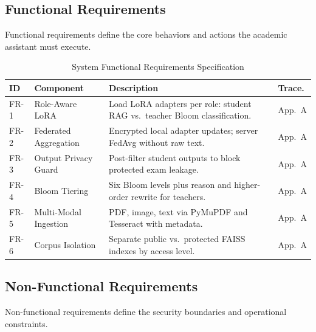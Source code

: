 \subsection{Functional Requirements}
Functional requirements define the core behaviors and actions the academic assistant must execute. 

\begin{small}
\begin{longtable}{|p{}|p{}|p{}|p{}|}
\caption{System Functional Requirements Specification} \label{tab:functional_requirements} \\
\hline
\textbf{ID} & \textbf{Component} & \textbf{Description} & \textbf{Trace.} \\ \hline
\endhead
FR-1 & Role-Aware LoRA & Load LoRA adapters per role: student RAG vs.\ teacher Bloom classification. & App.~A \\ \hline
FR-2 & Federated Aggregation & Encrypted local adapter updates; server FedAvg without raw text. & App.~A \\ \hline
FR-3 & Output Privacy Guard & Post-filter student outputs to block protected exam leakage. & App.~A \\ \hline
FR-4 & Bloom Tiering & Six Bloom levels plus reason and higher-order rewrite for teachers. & App.~A \\ \hline
FR-5 & Multi-Modal Ingestion & PDF, image, text via PyMuPDF and Tesseract with metadata. & App.~A \\ \hline
FR-6 & Corpus Isolation & Separate public vs.\ protected FAISS indexes by access level. & App.~A \\ \hline
\end{longtable}
\end{small}

\subsection{Non-Functional Requirements}
Non-functional requirements define the security boundaries and operational constraints.


